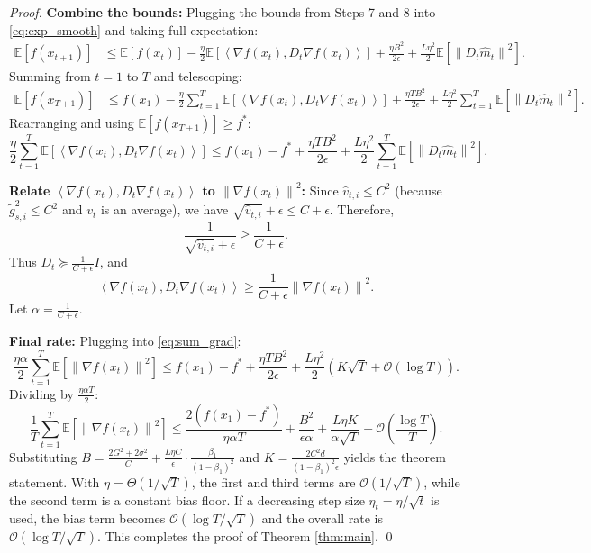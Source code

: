\documentclass{article}
\newcommand{\E}{\mathbb{E}}
\newcommand{\norm}[1]{\left\| #1 \right\|}
\newcommand{\inner}[2]{\left\langle #1, #2 \right\rangle}
\newcommand{\step}[1]{\text{[Step #1]}}
\begin{document}
\begin{proof}
\step{9} \textbf{Combine the bounds:} Plugging the bounds from Steps 7 and 8 into \eqref{eq:exp_smooth} and taking full expectation:
\begin{align}
    \E[f(x_{t+1})] &\le \E[f(x_t)] - \frac{\eta}{2} \E[\inner{\nabla f(x_t)}{D_t \nabla f(x_t)}] + \frac{\eta B^2}{2\epsilon} + \frac{L \eta^2}{2} \E[\norm{D_t \hat{m}_t}^2].
\end{align}
Summing from $t=1$ to $T$ and telescoping:
\begin{align}
    \E[f(x_{T+1})] &\le f(x_1) - \frac{\eta}{2} \sum_{t=1}^T \E[\inner{\nabla f(x_t)}{D_t \nabla f(x_t)}] + \frac{\eta T B^2}{2\epsilon} + \frac{L \eta^2}{2} \sum_{t=1}^T \E[\norm{D_t \hat{m}_t}^2].
\end{align}
Rearranging and using $\E[f(x_{T+1})] \ge f^*$:
\begin{equation} \label{eq:sum_grad}
    \frac{\eta}{2} \sum_{t=1}^T \E[\inner{\nabla f(x_t)}{D_t \nabla f(x_t)}] \le f(x_1) - f^* + \frac{\eta T B^2}{2\epsilon} + \frac{L \eta^2}{2} \sum_{t=1}^T \E[\norm{D_t \hat{m}_t}^2].
\end{equation}

\step{10} \textbf{Relate $\inner{\nabla f(x_t)}{D_t \nabla f(x_t)}$ to $\norm{\nabla f(x_t)}^2$:} Since $\hat{v}_{t,i} \le C^2$ (because $\tilde{g}_{s,i}^2 \le C^2$ and $v_t$ is an average), we have $\sqrt{\hat{v}_{t,i}} + \epsilon \le C + \epsilon$. Therefore,
\[
    \frac{1}{\sqrt{\hat{v}_{t,i}} + \epsilon} \ge \frac{1}{C + \epsilon}.
\]
Thus $D_t \succeq \frac{1}{C+\epsilon} I$, and
\[
    \inner{\nabla f(x_t)}{D_t \nabla f(x_t)} \ge \frac{1}{C+\epsilon} \norm{\nabla f(x_t)}^2.
\]
Let $\alpha = \frac{1}{C+\epsilon}$.

\step{11} \textbf{Final rate:} Plugging into \eqref{eq:sum_grad}:
\[
    \frac{\eta \alpha}{2} \sum_{t=1}^T \E[\norm{\nabla f(x_t)}^2] \le f(x_1) - f^* + \frac{\eta T B^2}{2\epsilon} + \frac{L \eta^2}{2} (K \sqrt{T} + \mathcal{O}(\log T)).
\]
Dividing by $\frac{\eta \alpha T}{2}$:
\[
    \frac{1}{T} \sum_{t=1}^T \E[\norm{\nabla f(x_t)}^2] \le \frac{2(f(x_1)-f^*)}{\eta \alpha T} + \frac{B^2}{\epsilon \alpha} + \frac{L \eta K}{\alpha \sqrt{T}} + \mathcal{O}\left(\frac{\log T}{T}\right).
\]
Substituting $B = \frac{2G^2+2\sigma^2}{C} + \frac{L \eta C}{\epsilon} \cdot \frac{\beta_1}{(1-\beta_1)^2}$ and $K = \frac{2 C^2 d}{(1-\beta_1)^2 \epsilon}$ yields the theorem statement. With $\eta = \Theta(1/\sqrt{T})$, the first and third terms are $\mathcal{O}(1/\sqrt{T})$, while the second term is a constant bias floor. If a decreasing step size $\eta_t = \eta/\sqrt{t}$ is used, the bias term becomes $\mathcal{O}(\log T/\sqrt{T})$ and the overall rate is $\mathcal{O}(\log T/\sqrt{T})$. This completes the proof of Theorem \ref{thm:main}. \qed


\end{proof}
\end{document}
